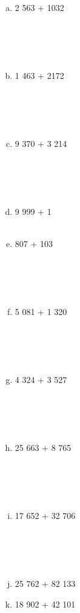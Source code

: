 \documentclass[a4paper,14pt]{article}
\begin{document}
\begin{multicols}{2}
\begin{enumerate}
\begin{enumerate}[a)]
				\item 2 563 + 1032 \\\\\\\\\\
				\item 1 463 + 2172 \\\\\\\\\\
				\item 9 370 + 3 214 \\\\\\\\\\
				\item 9 999 + 1 \\\\
				\item 807 + 103 \\\\\\\\\\
				\item 5 081 + 1 320 \\\\\\\\\\
				\item 4 324 + 3 527 \\\\\\\\\\
				\item 25 663 + 8 765 \\\\\\\\\\
				\item 17 652 + 32 706 \\\\\\\\\\
				\item 25 762 + 82 133 \newpage
				\item 18 902 + 42 101 \\\\\\\\\\

\end{enumerate}
\end{enumerate}
\end{multicols}
\end{document}
